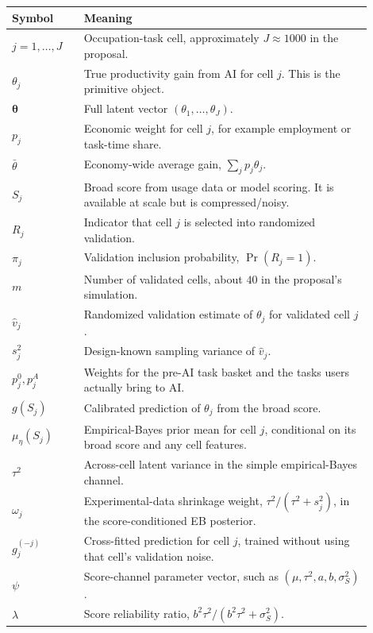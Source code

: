 \documentclass[11pt]{article}
\newcommand{\thetav}{\boldsymbol{\theta}}
\begin{document}
\begin{center}
\begin{tabular}{>{\raggedright\arraybackslash}p{0.18\linewidth}p{0.72\linewidth}}
\toprule
Symbol & Meaning \\
\midrule
$j=1,\ldots,J$ & Occupation-task cell, approximately $J\approx 1000$ in the proposal. \\
$\theta_j$ & True productivity gain from AI for cell $j$. This is the primitive object. \\
$\thetav$ & Full latent vector $(\theta_1,\ldots,\theta_J)$. \\
$p_j$ & Economic weight for cell $j$, for example employment or task-time share. \\
$\bar\theta$ & Economy-wide average gain, $\sum_j p_j\theta_j$. \\
$S_j$ & Broad score from usage data or model scoring. It is available at scale but is compressed/noisy. \\
$R_j$ & Indicator that cell $j$ is selected into randomized validation. \\
$\pi_j$ & Validation inclusion probability, $\Pr(R_j=1)$. \\
$m$ & Number of validated cells, about $40$ in the proposal's simulation. \\
$\widehat v_j$ & Randomized validation estimate of $\theta_j$ for validated cell $j$. \\
$s_j^2$ & Design-known sampling variance of $\widehat v_j$. \\
$p^0_j,p^A_j$ & Weights for the pre-AI task basket and the tasks users actually bring to AI. \\
$g(S_j)$ & Calibrated prediction of $\theta_j$ from the broad score. \\
$\mu_\eta(S_j)$ & Empirical-Bayes prior mean for cell $j$, conditional on its broad score and any cell features. \\
$\tau^2$ & Across-cell latent variance in the simple empirical-Bayes channel. \\
$\omega_j$ & Experimental-data shrinkage weight, $\tau^2/(\tau^2+s_j^2)$, in the score-conditioned EB posterior. \\
$g_j^{(-j)}$ & Cross-fitted prediction for cell $j$, trained without using that cell's validation noise. \\
$\psi$ & Score-channel parameter vector, such as $(\mu,\tau^2,a,b,\sigma_S^2)$. \\
$\lambda$ & Score reliability ratio, $b^2\tau^2/(b^2\tau^2+\sigma_S^2)$. \\
\bottomrule
\end{tabular}
\end{center}
\end{document}
